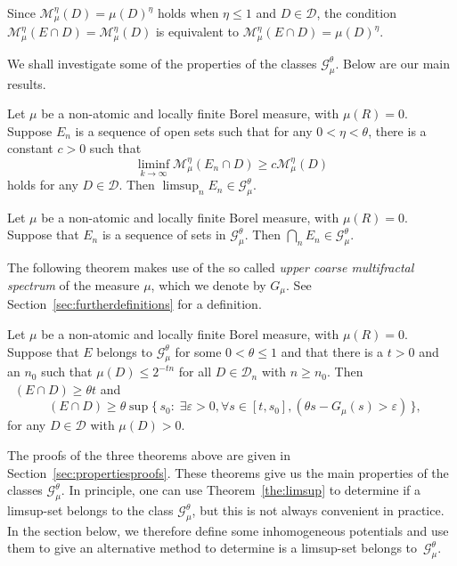 \documentclass[AHL,Unicode,longabstracts]{cedram}
\DeclareMathOperator{\dimh}{dim_H}
\newcommand*{\dimh}{\mathrm{dim}_{\mathrm{H}}}
\let\oldexists\exists
\renewcommand*{\exists}{\mathrel{\oldexists}}
\let\oldforall\forall
\renewcommand*{\forall}{\mathrel{\oldforall}}
\begin{document}
\begin{rema}
Since $\mathscr{M}_\mu^\eta (D) = \mu (D)^\eta$ holds when $\eta
\leq 1$ and $D \in \mathscr{D}$, the condition $\mathscr{M}_\mu^\eta (E \cap D) = \mathscr{M}_\mu^\eta (D)$ is equivalent to $\mathscr{M}_\mu^\eta (E \cap D) = \mu (D)^\eta$.
\end{rema}

We shall investigate some of the properties of the classes $\mathscr{G}_\mu^\theta$. Below are our main results.

\begin{theo}\label{the:limsup}
Let $\mu$ be a non-atomic and locally finite Borel measure, with $\mu (R) = 0$. Suppose $E_n$ is a sequence of open sets such that for any $0 < \eta < \theta$, there is a constant $c > 0$ such that
\[
\liminf_{k\to\infty} \mathscr{M}_\mu^\eta (E_n \cap D) \geq c
\mathscr{M}_\mu^\eta (D)
\]
holds for any $D \in \mathscr{D}$. Then $\limsup_n E_n \in
\mathscr{G}_\mu^\theta$.
\end{theo}

\begin{theo}\label{the:intersection}
Let $\mu$ be a non-atomic and locally finite Borel measure, with $\mu (R) = 0$. Suppose that $E_n$ is a sequence of sets in $\mathscr{G}_\mu^\theta$. Then $\bigcap_n E_n \in
\mathscr{G}_\mu^\theta$.
\end{theo}

The following theorem makes use of the so called \emph{upper coarse multifractal spectrum} of the measure $\mu$, which we denote by $G_\mu$. See Section~\ref{sec:furtherdefinitions} for a definition.

\begin{theo}\label{the:dimension}
Let $\mu$ be a non-atomic and locally finite Borel measure, with $\mu (R) = 0$. Suppose that $E$ belongs to $\mathscr{G}_\mu^\theta$ for some $0 < \theta \leq 1$ and that there is a $t > 0$ and an $n_0$ such that $\mu (D) \leq 2^{-tn}$ for all $D \in \mathscr{D}_n$ with $n \geq n_0$. Then $\dimh (E \cap D) \geq \theta t$ and
\[
\dimh (E \cap D) \geq \theta \sup \{\, s_0 :\; \exists \varepsilon > 0, \forall s\in [t,s_0], (\theta s - G_\mu (s) > \varepsilon) \,\},
\]
for any $D \in \mathscr{D}$ with $\mu (D) > 0$.
\end{theo}

The proofs of the three theorems above are given in Section~\ref{sec:propertiesproofs}. These theorems give us the main properties of the classes $\mathscr{G}_\mu^\theta$. In principle, one can use Theorem~\ref{the:limsup} to determine if a limsup-set belongs to the class $\mathscr{G}_\mu^\theta$, but this is not always convenient in practice. In the section below, we therefore define some inhomogeneous potentials and use them to give an alternative method to determine is a limsup-set belongs to~$\mathscr{G}_\mu^\theta$.
\end{document}
